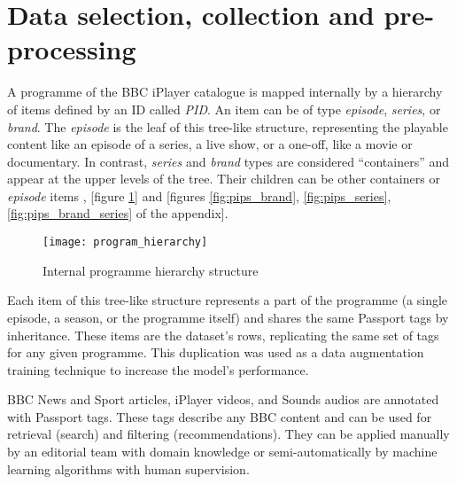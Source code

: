 
\section{Data selection, collection and pre-processing}


A programme of the BBC iPlayer catalogue is mapped internally by a hierarchy of items defined by an ID called \textit{PID}.
An item can be of type \textit{episode}, \textit{series}, or \textit{brand}. The \textit{episode} is the leaf of this tree-like structure,
representing the playable content like an episode of a series, a live show, or a one-off, like a movie or documentary.
In contrast, \textit{series} and \textit{brand} types are considered ``containers'' and appear at the upper levels of the tree.
Their children can be other containers or \textit{episode} items \cite{BBC:ProgrammePages,BBC:ProgrammeUrlStructure},
[figure \ref{fig:program_hierarchy}] and [figures \ref{fig:pips_brand}, \ref{fig:pips_series}, \ref{fig:pips_brand_series} of the appendix].

\begin{figure}[h]
  \centering
  \texttt{[image: program\_hierarchy]}
  \caption{Internal programme hierarchy structure}
  \label{fig:program_hierarchy}
\end{figure}

Each item of this tree-like structure represents a part of the programme
(a single episode, a season, or the programme itself)
and shares the same Passport tags by inheritance.
These items are the dataset's rows, replicating the same set of tags for any given programme.
This duplication was used as a data augmentation training technique to increase the model's performance.

BBC News and Sport articles, iPlayer videos, and Sounds audios are annotated with Passport tags.
These tags describe any BBC content and can be used for retrieval (search) and filtering (recommendations).
They can be applied manually by an editorial team with domain knowledge
or semi-automatically by machine learning algorithms with human supervision.

